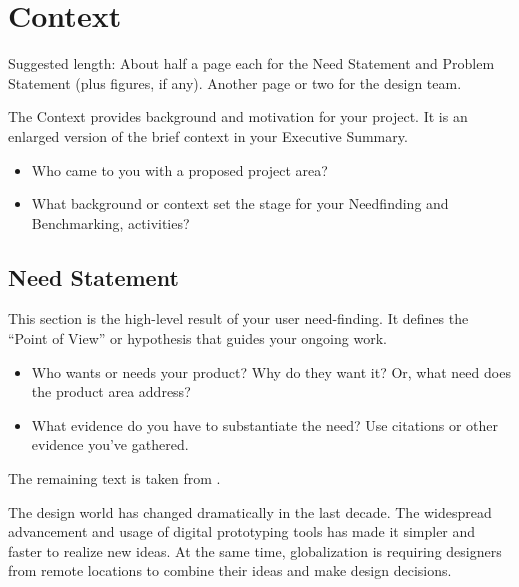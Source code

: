 \chapter{Context}
\label{sec-context} %

\begin{remark} \color{blue}
Suggested length: About half a page each for the Need Statement and Problem Statement (plus figures, if any). Another page or two for the design team.
\vspace{0.1in}

\noindent The Context provides background and motivation for your project. It is an enlarged version of the brief context in your Executive Summary.  
\begin{itemize} \tightlist
\item Who came to you with a proposed project area? 
\item What background or context set the stage for your Needfinding and Benchmarking, activities?
\end{itemize}
\normalcolor \end{remark}

\section{Need Statement}
\label{sec:need}

\begin{remark} \color{blue}
This section is the high-level result of your user need-finding. It defines the ``Point of View'' or hypothesis that guides your ongoing work. 
\begin{itemize} \tightlist
\item Who wants or needs your product? Why do they want it? Or, what need does the product area address? 
\item What evidence do you have to substantiate the need? Use citations or other evidence you've gathered.
\end{itemize}

\noindent The remaining text is taken from \cite{Autodesk2008Fall}.
\normalcolor \end{remark}

The design world has changed dramatically in the last decade. The widespread advancement and usage of digital prototyping tools has made it simpler and faster to realize new ideas. At the same time, globalization is requiring designers from remote locations to combine their ideas and make design decisions. 

